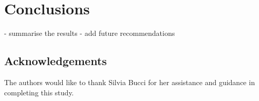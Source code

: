 \documentclass[10pt,twocolumn,letterpaper]{article}
\begin{document}
\section{Conclusions}
\label{sec:conclusion}

- summarise the results
- add future recommendations

\subsection{Acknowledgements}
The authors would like to thank Silvia Bucci for her assistance and guidance in completing this study.


{\small


}
\end{document}
